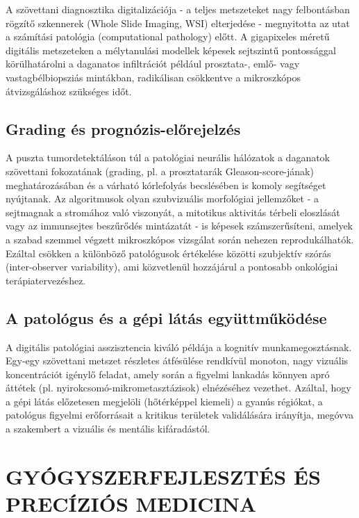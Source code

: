 \documentclass[12pt,a4paper,oneside]{book}
\begin{document}
A szövettani diagnosztika digitalizációja - a teljes metszeteket nagy felbontásban rögzítő szkennerek (Whole Slide Imaging, WSI) elterjedése - megnyitotta az utat a számítási patológia (computational pathology) előtt. A gigapixeles méretű digitális metszeteken a mélytanulási modellek képesek sejtszintű pontossággal körülhatárolni a daganatos infiltrációt például prosztata-, emlő- vagy vastagbélbiopsziás mintákban, radikálisan csökkentve a mikroszkópos átvizsgáláshoz szükséges időt.

\subsection{Grading és prognózis-előrejelzés}

A puszta tumordetektáláson túl a patológiai neurális hálózatok a daganatok szövettani fokozatának (grading, pl. a prosztatarák Gleason-score-jának) meghatározásában és a várható kórlefolyás becslésében is komoly segítséget nyújtanak. Az algoritmusok olyan szubvizuális morfológiai jellemzőket - a sejtmagnak a stromához való viszonyát, a mitotikus aktivitás térbeli eloszlását vagy az immunsejtes beszűrődés mintázatát - is képesek számszerűsíteni, amelyek a szabad szemmel végzett mikroszkópos vizsgálat során nehezen reprodukálhatók. Ezáltal csökken a különböző patológusok értékelése közötti szubjektív szórás (inter-observer variability), ami közvetlenül hozzájárul a pontosabb onkológiai terápiatervezéshez.

\subsection{A patológus és a gépi látás együttműködése}

A digitális patológiai asszisztencia kiváló példája a kognitív munkamegosztásnak. Egy-egy szövettani metszet részletes átfésülése rendkívül monoton, nagy vizuális koncentrációt igénylő feladat, amely során a figyelmi lankadás könnyen apró áttétek (pl. nyirokcsomó-mikrometasztázisok) elnézéséhez vezethet. Azáltal, hogy a gépi látás előzetesen megjelöli (hőtérképpel kiemeli) a gyanús régiókat, a patológus figyelmi erőforrásait a kritikus területek validálására irányítja, megóvva a szakembert a vizuális és mentális kifáradástól.

\section{GYÓGYSZERFEJLESZTÉS ÉS PRECÍZIÓS MEDICINA}
\end{document}
